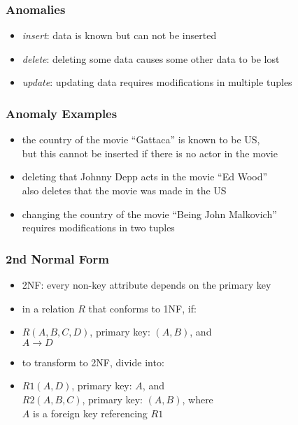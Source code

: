 \documentclass[dvipsnames]{beamer}
\begin{document}
\begin{frame}
  \frametitle{Anomalies}

  \begin{itemize}
    \item \emph{insert}: data is known but can not be inserted

    \medskip
    \item \emph{delete}: deleting some data causes some other data to be lost

    \medskip
    \item \emph{update}: updating data requires modifications in multiple tuples
  \end{itemize}
\end{frame}

\begin{frame}
  \frametitle{Anomaly Examples}

  \hyperlink{example_db_1}{}

  \begin{itemize}
    \item the country of the movie ``Gattaca'' is known to be US,\\
      but this cannot be inserted if there is no actor in the movie

    \pause
    \medskip
    \item deleting that Johnny Depp acts in the movie ``Ed Wood''\\
      also deletes that the movie was made in the US

    \pause
    \medskip
    \item changing the country of the movie ``Being John Malkovich''\\
      requires modifications in two tuples
  \end{itemize}
\end{frame}

\begin{frame}
  \frametitle{2nd Normal Form}

  \begin{itemize}
    \item \alert{2NF}: every non-key attribute depends on the primary key

    \pause
    \medskip
    \item in a relation $R$ that conforms to 1NF, if:
    \item $R(A,B,C,D)$, primary key: $(A,B)$, and\\
      $A \rightarrow D$

    \medskip
    \item to transform to 2NF, divide into:
    \item $R1(A,D)$, primary key: $A$, and\\
      $R2(A,B,C)$, primary key: $(A,B)$, where\\
      $A$ is a foreign key referencing $R1$
  \end{itemize}
\end{frame}
\end{document}

